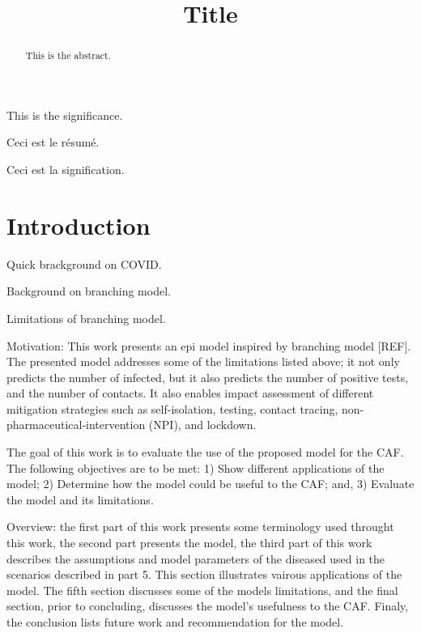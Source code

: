 \documentclass[sr]{drdc-report}
\title{Title}
\begin{document}
 \makefrontcover

 \begin{abstract}
This is the abstract.
 \end{abstract}

 \begin{significance}
This is the significance.
 \end{significance}

 \begin{fabstract}
Ceci est le r\'esum\'e.
 \end{fabstract}

 \begin{fsignificance}
Ceci est la signification.

 \end{fsignificance}

 \tableofcontents\clearpage
 \listoffigures
 \listoftables


\section{Introduction}
Quick brackground on COVID.

Background on branching model.

Limitations of branching model.

Motivation: This work presents an epi model inspired by branching model [REF]. The presented model addresses some of the limitations listed above; it not only predicts the number of infected, but it also predicts the number of positive tests, and the number of contacts. It also enables impact assessment of different mitigation strategies such as self-isolation, testing, contact tracing, non-pharmaceutical-intervention (NPI), and lockdown.

The goal of this work is to evaluate the use of the proposed model for the CAF. The following objectives are to be met:
1)	Show different applications of the model;
2)	Determine how the model could be useful to the CAF; and,
3)	Evaluate the model and its limitations.

Overview: the first part of this work presents some terminology used throught this work, the second part presents the model, the third part of this work describes the assumptions and model parameters of the diseased used in the scenarios described in part 5. This section illustrates vairous applications of the model. The fifth section discusses some of the models limitations, and the final section, prior to concluding, discusses the model's usefulness to the CAF. Finaly, the conclusion lists future work and recommendation for the model.
\end{document}
